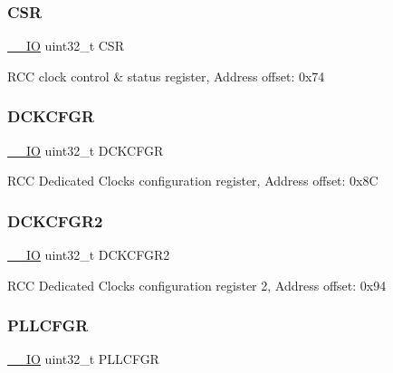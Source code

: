 \subsubsection{\texorpdfstring{C\+SR}{CSR}}
{\footnotesize\ttfamily \mbox{\hyperlink{core__sc300_8h_aec43007d9998a0a0e01faede4133d6be}{\+\_\+\+\_\+\+IO}} uint32\+\_\+t C\+SR}

R\+CC clock control \& status register, Address offset\+: 0x74 \mbox{\label{struct_r_c_c___type_def_a0a5d6d20b17d55b2e892a924b6e70296}} 
\subsubsection{\texorpdfstring{D\+C\+K\+C\+F\+GR}{DCKCFGR}}
{\footnotesize\ttfamily \mbox{\hyperlink{core__sc300_8h_aec43007d9998a0a0e01faede4133d6be}{\+\_\+\+\_\+\+IO}} uint32\+\_\+t D\+C\+K\+C\+F\+GR}

R\+CC Dedicated Clocks configuration register, Address offset\+: 0x8C \mbox{\label{struct_r_c_c___type_def_af5c08405ec6124981a61e07985ef3bc9}} 
\subsubsection{\texorpdfstring{D\+C\+K\+C\+F\+G\+R2}{DCKCFGR2}}
{\footnotesize\ttfamily \mbox{\hyperlink{core__sc300_8h_aec43007d9998a0a0e01faede4133d6be}{\+\_\+\+\_\+\+IO}} uint32\+\_\+t D\+C\+K\+C\+F\+G\+R2}

R\+CC Dedicated Clocks configuration register 2, Address offset\+: 0x94 \mbox{\label{struct_r_c_c___type_def_ae6ff257862eba6b4b367feea786bf1fd}} 
\subsubsection{\texorpdfstring{P\+L\+L\+C\+F\+GR}{PLLCFGR}}
{\footnotesize\ttfamily \mbox{\hyperlink{core__sc300_8h_aec43007d9998a0a0e01faede4133d6be}{\+\_\+\+\_\+\+IO}} uint32\+\_\+t P\+L\+L\+C\+F\+GR}

